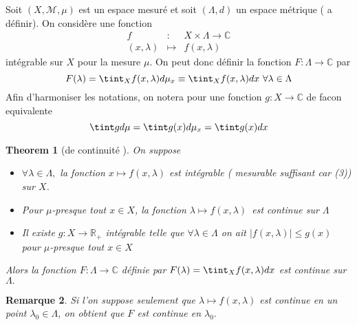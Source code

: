 \documentclass[3pt]{article}
\newtheorem{theorem}{Theorem}
\newtheorem{remark}[theorem]{Remarque}
\begin{document}
Soit $(X,\mathcal{M},\mu )$ est un espace mesur\'{e} et soit $(\Lambda ,d)$
un espace m\'{e}trique ( a d\'{e}finir). On consid\`{e}re une fonction 
\begin{eqnarray*}
f &:&X\times \Lambda \rightarrow \mathbb{C} \\
(x,\lambda ) &\longmapsto &f(x,\lambda )
\end{eqnarray*}%
int\'{e}grable sur $X$ pour la mesure $\mu .$ On peut donc d\'{e}finir la
fonction $F:\Lambda \rightarrow \mathbb{C}$ par%
\begin{equation*}
F(\lambda )=\tint_{X}f(x,\lambda )d\mu _{x}\equiv \tint_{X}f(x,\lambda )dx%
\text{ }\forall \lambda \in \Lambda
\end{equation*}%
Afin d'harmoniser les notations, on notera pour une fonction $g:X\rightarrow 
\mathbb{C}$ de facon equivalente 
\begin{equation*}
\tint gd\mu =\tint g(x)d\mu _{x}=\tint g(x)dx
\end{equation*}

\bigskip

\begin{theorem}[de continuit\'{e} ]
On suppose

\begin{itemize}
\item $\forall \lambda \in \Lambda ,$ la fonction $x\longmapsto f(x,\lambda
) $ est int\'{e}grable ( mesurable suffisant car (3)) sur $X$.

\item Pour $\mu $-presque tout $x\in X$, la fonction $\lambda \longmapsto
f(x,\lambda )$\ est continue sur $\Lambda $

\item Il existe $g:X\rightarrow \mathbb{R}_{+}$ int\'{e}grable telle que $%
\forall \lambda \in \Lambda $ on ait $\left\vert f(x,\lambda )\right\vert
\leq g(x)$ pour $\mu $-presque tout $x\in X$
\end{itemize}

Alors la fonction $F:\Lambda \rightarrow \mathbb{C}$ d\'{e}finie par $%
F(\lambda )=\tint_{X}f(x,\lambda )dx$ est continue sur $\Lambda .$
\end{theorem}

\bigskip 

\begin{remark}
Si l'on suppose seulement que $\lambda \longmapsto f(x,\lambda )$ est
continue en un point $\lambda _{0}\in \Lambda $, on obtient que $F$ est
continue en $\lambda _{0}.$
\end{remark}
\end{document}
